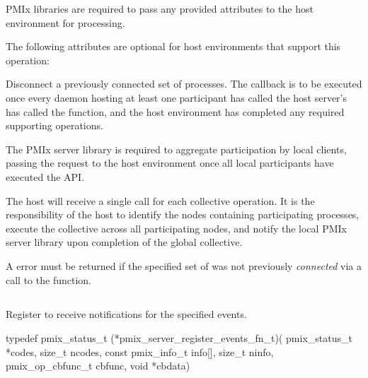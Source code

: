 \reqattrstart
\ac{PMIx} libraries are required to pass any provided attributes to the host environment for processing.
\reqattrend

\optattrstart
The following attributes are optional for host environments that support this operation:


\optattrend

\descr

Disconnect a previously connected set of processes. The callback is to be executed once every daemon hosting at least one participant has called the host server's has called the  function, and the host environment has completed any required supporting operations.

\adviceimplstart
The \ac{PMIx} server library is required to aggregate participation by local clients, passing the request to the host environment once all local participants have executed the \ac{API}.
\adviceimplend

\advicermstart
The host will receive a single call for each collective operation. It is the responsibility of the host to identify the nodes containing participating processes, execute the collective across all participating nodes, and notify the local \ac{PMIx} server library upon completion of the global collective.

A  error must be returned if the specified set of  was not previously \textit{connected} via a call to the  function.
\advicermend


\subsection{}

\summary

Register to receive notifications for the specified events.

\format

\cspecificstart
\begin{codepar}
 typedef pmix_status_t (*pmix_server_register_events_fn_t)(
                              pmix_status_t *codes,
                              size_t ncodes,
                              const pmix_info_t info[],
                              size_t ninfo,
                              pmix_op_cbfunc_t cbfunc,
                              void *cbdata)
\end{codepar}
\cspecificend

